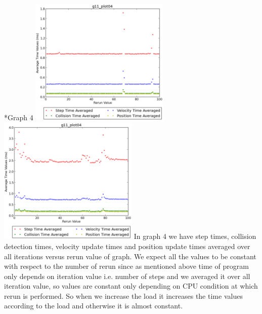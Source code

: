 \documentclass[11pt]{article}
\begin{document}
\begin{subsection}*{Graph 4}
\includegraphics[width=0.5\textwidth,keepaspectratio]{4.eps} \includegraphics[width=0.5\textwidth,keepaspectratio]{load_4.eps}
In graph 4 we have step times, collision detection times, velocity update times and position update times averaged over all iterations versus rerun value of graph. 
We expect all the values to be constant with respect to the number of rerun since as mentioned above time of program only depends on iteration value i.e. number of steps and we averaged it over all iteration value, so values are constant only depending on CPU condition at which rerun is performed.
So when we increase the load it increases the time values according to the load and otherwise it is almost constant.
\end{subsection}
\end{document}
